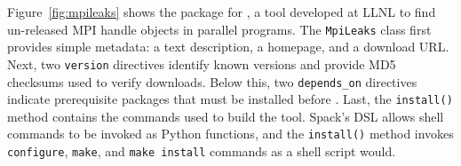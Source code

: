 Figure~\ref{fig:mpileaks} shows the package for \mpileaks, a tool developed
at LLNL to find un-released MPI handle objects in parallel programs.
The {\tt MpiLeaks} class first provides simple metadata: a text description,
a homepage, and a download URL.  
Next, two {\tt version} directives identify known versions and provide
MD5 checksums used to verify downloads.
Below this, two {\tt depends\_on}
directives indicate prerequisite packages that must be installed before \mpileaks.
Last, the {\tt install()} method contains the commands used to build
the tool.  Spack's DSL allows shell commands to be invoked as Python functions,
and the {\tt install()} method invokes {\tt configure},
{\tt make}, and {\tt make install} commands as a shell script would.







